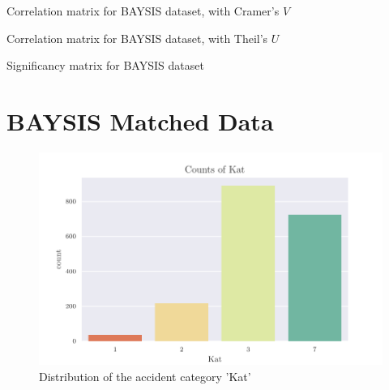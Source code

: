 \documentclass[a4paper,headsepline,footsepline,fontsize=11pt,BCOR=12mm,DIV=12]{report}
\newcommand{\nocontentsline}[3]{}
\newcommand{\tocless}[2]{\bgroup\let\addcontentsline=\nocontentsline#1{#2}\egroup}
\begin{document}
\begin{appendices}
\begin{table}
\tiny
\setlength{\tabcolsep}{4pt}
\centering

\caption{Correlation matrix for BAYSIS dataset, with Cramer's $V$}
\label{table:appendix_correlation_matrix_dataset_cramers}
\end{table}

\begin{table}
\tiny
\setlength{\tabcolsep}{4pt}
\centering

\caption{Correlation matrix for BAYSIS dataset, with Theil's $U$}
\label{table:appendix_correlation_matrix_dataset_theils}
\end{table}

\begin{table}
\tiny
\setlength{\tabcolsep}{4pt}
\centering

\caption{Significancy matrix for BAYSIS dataset}
\label{table:appendix_significancy_matrix_dataset}
\end{table}
\restoregeometry

\tocless\section{BAYSIS Matched Data}
\label{appendix_baysis_dataset}

\begin{figure}[h]
	\centering
	\includegraphics[scale=1]{../CorrAnalysis/data/BAYSIS/02_matched/plots/baysis_matched_count_Kat}
	\caption{Distribution of the accident category 'Kat'}
	\label{img:appendix_baysis_matched_Kat}
\end{figure}


\end{appendices}
\end{document}
